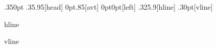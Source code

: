\usepackage[utf8]{vietnam}
\usepackage[margin=10mm]{geometry}
\usepackage{array,color,enumitem,graphicx,hyperref,tikz}
\usepackage{flowfram}

\renewcommand{\familydefault}{\sfdefault}
\pagestyle{empty}
\setlength\parindent{0pt}


 {.35\textwidth}{0pt}
 {.35\textwidth}{.95\textheight}[head]
 {0pt}{.85\textheight}[avt]
 {0pt}{0pt}[left]
 {.325\textwidth}{.9\textheight}[hline]
 {.3\textwidth}{0pt}[vline]

\begin{dynamiccontents*}{hline}
	\vspace{7mm}
	\hspace{.5mm}
\end{dynamiccontents*}
\begin{dynamiccontents*}{vline}
	\hspace{3mm}
\end{dynamiccontents*}

